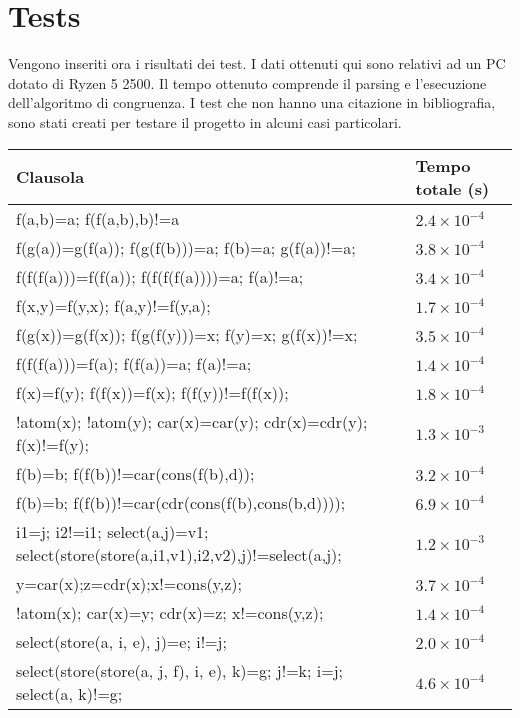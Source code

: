 \chapter{Tests}
Vengono inseriti ora i risultati dei test. I dati ottenuti qui sono relativi ad un PC dotato di Ryzen 5 2500. Il tempo
ottenuto comprende il parsing e l'esecuzione dell'algoritmo di congruenza. I test che non hanno una citazione in bibliografia,
sono stati creati per testare il progetto in alcuni casi particolari.
\begin{center}
    \begin{tabular}{|m{8cm}|m{2cm}|}
        \hline
        \textbf{Clausola} & \textbf{Tempo totale (s)} \\ \hline
         f(a,b)=a; f(f(a,b),b)!=a \cite{bradleymanna}& $2.4\times10^{-4}$ \\ \hline
         f(g(a))=g(f(a)); f(g(f(b)))=a; f(b)=a; g(f(a))!=a; \cite{bradleymanna} & $3.8\times10^{-4}$ \\ \hline
         f(f(f(a)))=f(f(a)); f(f(f(f(a))))=a; f(a)!=a;  \cite{bonacina_2}& $3.4\times10^{-4}$ \\ \hline
         f(x,y)=f(y,x); f(a,y)!=f(y,a); \cite{bradleymanna} & $1.7\times10^{-4}$ \\ \hline
         f(g(x))=g(f(x)); f(g(f(y)))=x; f(y)=x; g(f(x))!=x; \cite{bradleymanna} & $3.5\times10^{-4}$ \\ \hline
         f(f(f(a)))=f(a); f(f(a))=a; f(a)!=a; \cite{bradleymanna} & $1.4\times10^{-4}$ \\ \hline
         f(x)=f(y); f(f(x))=f(x); f(f(y))!=f(f(x));  & $1.8\times10^{-4}$ \\ \hline
         !atom(x);  !atom(y);  car(x)=car(y);  cdr(x)=cdr(y);  f(x)!=f(y); \cite{bradleymanna} & $1.3\times10^{-3}$ \\ \hline
         f(b)=b; f(f(b))!=car(cons(f(b),d));  & $3.2\times10^{-4}$ \\ \hline
         f(b)=b; f(f(b))!=car(cdr(cons(f(b),cons(b,d)))); \cite{bonacina} & $6.9\times10^{-4}$ \\ \hline
         i1=j; i2!=i1; select(a,j)=v1; select(store(store(a,i1,v1),i2,v2),j)!=select(a,j); \cite{bradleymanna}& $1.2\times10^{-3}$ \\ \hline
         y=car(x);z=cdr(x);x!=cons(y,z);\cite{bradleymanna} & $3.7 \times10^{-4}$  \\ \hline
         !atom(x); car(x)=y; cdr(x)=z; x!=cons(y,z);\cite{bradleymanna}  & $1.4\times10^{-4}$  \\ \hline
         select(store(a, i, e), j)=e; i!=j; \cite{bradleymanna} & $2.0 \times 10^{-4}$ \\ \hline
         select(store(store(a, j, f), i, e), k)=g; j!=k; i=j; select(a, k)!=g; \cite{bradleymanna} & $4.6\times10^{-4}$ \\ \hline
    \end{tabular}
\end{center}